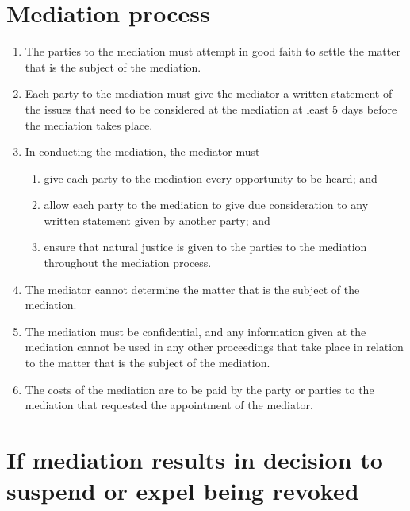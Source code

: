 \hypertarget{mediation-process}{%
\section{Mediation process}\label{mediation-process}}

\begin{enumerate}

\item The parties to the mediation must attempt in good faith to settle the matter that is the subject of the mediation.
\item Each party to the mediation must give the mediator a written statement of the issues that need to be considered at the mediation at least 5 days before the mediation takes place.
\item In conducting the mediation, the mediator must ---

  \begin{enumerate}
  
  \item give each party to the mediation every opportunity to be heard; and
  \item allow each party to the mediation to give due consideration to any written statement given by another party; and
  \item ensure that natural justice is given to the parties to the mediation throughout the mediation process.
  \end{enumerate}
\item The mediator cannot determine the matter that is the subject of the mediation.
\item The mediation must be confidential, and any information given at the mediation cannot be used in any other proceedings that take place in relation to the matter that is the subject of the mediation.
\item The costs of the mediation are to be paid by the party or parties to the mediation that requested the appointment of the mediator.
\end{enumerate}

\hypertarget{if-mediation-results-in-decision-to-suspend-or-expel-being-revoked}{%
\section{If mediation results in decision to suspend or expel being revoked}\label{if-mediation-results-in-decision-to-suspend-or-expel-being-revoked}}

